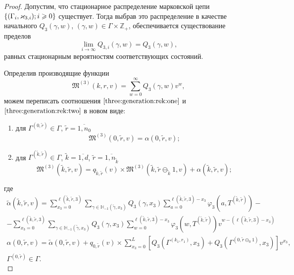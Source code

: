 \documentclass{report}
\newcommand{\MarkThree}{\{(\Gamma_i, \varkappa_{3,i}); \hm{} i \geqslant 0\}}
\begin{document}
\begin{proof}

Допустим, что стационарное распределение марковской цепи $\MarkThree$ существует. Тогда выбрав это распределение в качестве начального $Q_3(\gamma,w)$, $(\gamma,w)\in \Gamma\times {\mathbb Z}_+$, обеспечивается существование пределов 
$$
\lim_{i\to \infty} Q_{3,i}(\gamma,w) = Q_3(\gamma,w),
$$
равных стационарным вероятностям соответствующих состояний. 

Определив производящие функции
$$
\mathfrak{M}^{(3)}(k,r,v) = \sum_{w=0}^{\infty} Q_3(\gamma,w) v^w,
$$
можем переписать соотношения $\eqref{three:generation:rek:one}$ и $\eqref{three:generation:rek:two}$ в новом виде:
\begin{enumerate}
\item для $ \Gamma^{(0,\tilde{r})} \in \Gamma$, $\tilde{r} = \overline{1,n_0}$ 
\begin{equation}
\mathfrak{M}^{(3)}(0,\tilde{r},v) = \alpha(0,\tilde{r},v);
\label{three:generation:one}
\end{equation}
\item для $\Gamma^{(\tilde{k},\tilde{r})} \in \Gamma $, $\tilde{k} =\overline{1,d}$, $\tilde{r}=\overline{1,n_{\tilde{k}}}$
\begin{equation}
\mathfrak{M}^{(3)}(\tilde{k},\tilde{r},v) = q_{\tilde{k},\tilde{r}} (v)\times  \mathfrak{M}^{(3)}(\tilde{k},\tilde{r} \ominus_{\tilde{k}} 1,v) + \alpha(\tilde{k},\tilde{r},v);
\label{three:generation:two}
\end{equation}
\end{enumerate}
где 
\begin{multline}
\tilde{\alpha}(\tilde{k},\tilde{r},v) = \sum_{x_3=0}^{\ell(\tilde{k},\tilde{r},3)}\sum_{\gamma \in {\mathbb H}_{-1}(\tilde{\gamma},x_3)} Q_3(\gamma,x_3) \sum_{a=0}^{\ell(\tilde{k},\tilde{r},3) - x_3} \varphi_3(a,T^{(\tilde{k},\tilde{r})}) - \\
- \sum_{x_3=0}^{\ell(\tilde{k},\tilde{r},3)}  \sum_{\gamma \in {\mathbb H}_{-1}(\tilde{\gamma},x_3)} Q_3(\gamma,x_3) \sum_{w=0}^{\ell(\tilde{k},\tilde{r},3) -x_3}
\varphi_3(w,T^{(\tilde{k},\tilde{r})}) v^{w-(\ell(\tilde{k},\tilde{r},3)-x_3)}
\end{multline}
\begin{multline}
\alpha(0,\tilde{r},v) =\tilde{\alpha}(0,\tilde{r},v) + q_{0,\tilde{r}}(v) \times \sum_{x_3=0}^{L} \left[ Q_3(\Gamma^{(k_1,r_1)},x_3) + Q_3(\Gamma^{(0,\tilde{r}\ominus_0 1)},x_3) \right] v^{x_3}, \\ \Gamma^{(0,\tilde{r})} \in \Gamma.
\end{multline}

\end{proof}
\end{document}
